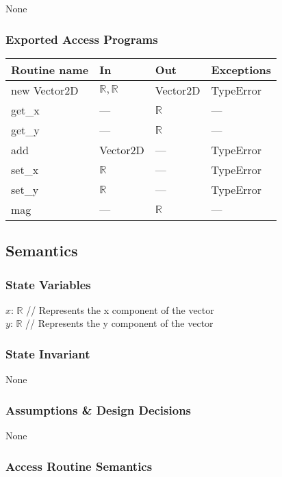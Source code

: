 \documentclass[12pt]{article}
\begin{document}
None

\subsubsection* {Exported Access Programs}

\begin{tabular}{| l | l | l | p{5cm} |}
\hline
\textbf{Routine name} & \textbf{In} & \textbf{Out} & \textbf{Exceptions}\\
\hline
new Vector2D & $\mathbb{R, R}$ & Vector2D & TypeError\\
\hline
get\_x       & ---          & $\mathbb{R}$ & ---\\
\hline
get\_y       & ---          & $\mathbb{R}$ & ---\\
\hline
add          & Vector2D     & ---          & TypeError\\
\hline
set\_x       & $\mathbb{R}$ & ---          & TypeError\\
\hline
set\_y       & $\mathbb{R}$ & ---          & TypeError\\
\hline
mag          & ---          & $\mathbb{R}$ & ---\\
\hline
\end{tabular}

\subsection* {Semantics}

\subsubsection* {State Variables}

$x$: $\mathbb{R}$ // Represents the x component of the vector\\ 
$y$: $\mathbb{R}$ // Represents the y component of the vector

\subsubsection* {State Invariant}
None

\subsubsection* {Assumptions \& Design Decisions}
None

\subsubsection* {Access Routine Semantics}
\end{document}
